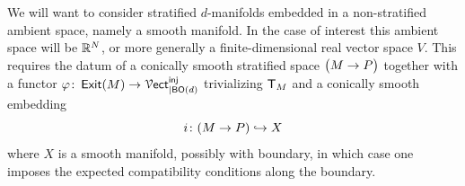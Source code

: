 \begin{remark}
    We will want to consider stratified $d$-manifolds embedded in a non-stratified ambient space, namely a smooth manifold. In the case of interest this ambient space will be $\mathbb R^{N}$, or more generally a finite-dimensional real vector space $V$. This requires the datum of a conically smooth stratified space $\big(M \rightarrow P\big)$ together with a functor $\varphi \colon \operatorname{\sf Exit}(M) \rightarrow \operatorname{\mathcal V{\sf ect}}^{\operatorname{\mathsf{inj}}}_{|\mathsf B\mathsf O(d)}$ trivializing $\mathsf T_{M}$ and a conically smooth embedding 
    \begin{equation}
        i \colon (M \rightarrow P) \hookrightarrow X
    \end{equation}
    where $X$ is a smooth manifold, possibly with boundary, in which case one imposes the expected compatibility conditions along the boundary.
\end{remark}

